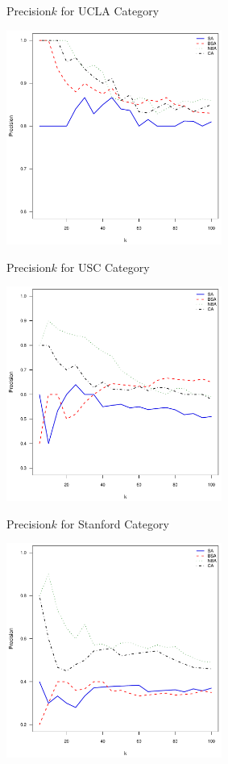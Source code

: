 \documentclass{beamer}
\begin{document}
\begin{frame}{Precision\at$k$ for UCLA Category}
\begin{center}
  \includegraphics[width=200pt]{experiment/e1_ucla.pdf}  
\end{center}
\end{frame}

\begin{frame}{Precision\at$k$ for USC Category}
\begin{center}
  \includegraphics[width=200pt]{experiment/e1_usc.pdf}
\end{center}
\end{frame}

\begin{frame}{Precision\at$k$ for Stanford Category}
\begin{center}
  \includegraphics[width=200pt]{experiment/e1_stanford.pdf}
\end{center}
\end{frame}
\end{document}
